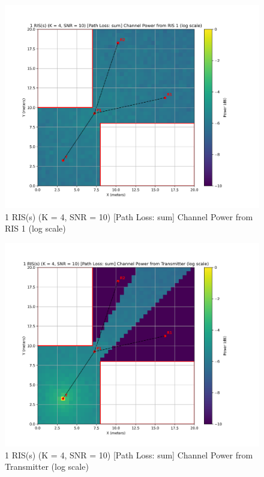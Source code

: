 \begin{figure}[H]
  \centering
  \includegraphics[width=0.8\linewidth]{imgs/heatmap-simulations/1 RIS(s) (K = 4, SNR = 10) [Path Loss_ sum] Channel Power from RIS 1 (log scale).png}
  \caption{1 RIS(s) (K = 4, SNR = 10) [Path Loss: sum] Channel Power from RIS 1 (log scale)}
\end{figure}

\begin{figure}[H]
  \centering
  \includegraphics[width=0.8\linewidth]{imgs/heatmap-simulations/1 RIS(s) (K = 4, SNR = 10) [Path Loss_ sum] Channel Power from Transmitter (log scale).png}
  \caption{1 RIS(s) (K = 4, SNR = 10) [Path Loss: sum] Channel Power from Transmitter (log scale)}
\end{figure}

